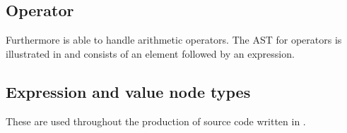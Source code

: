 %

\subsection{Operator}%

Furthermore \productname{} is able to handle arithmetic operators. The AST for operators is illustrated in  and consists of an element followed by an expression.%

%


\subsection{Expression and value node types}

These are used throughout the production of source code written in \productname{}.

%
%
%
%
%
%
%

